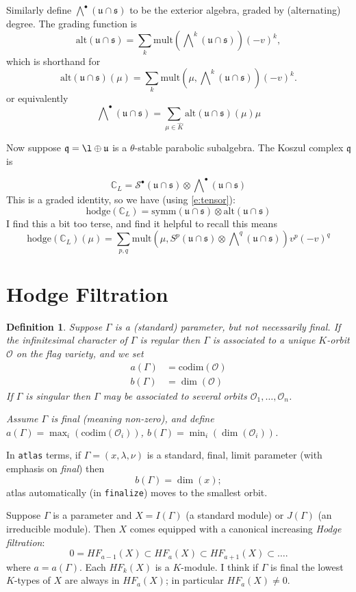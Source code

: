 \documentclass[12pt,leqno]{article}
\newtheorem{definition}[equation]{Definition}
\newcommand{\hodge}{\text{hodge}}
\newcommand{\codim}{\text{codim}}
\newcommand{\hf}{HF}
\newcommand{\mult}{\text{mult}}
\renewcommand{\O}{\mathcal O}
\newcommand{\Sdot}{\mathcal S^{\bullet}}
\newcommand{\symm}{\text{symm}}
\newcommand{\alt}{\text{alt}}
\newcommand{\bigwedgedot}{\mathcal \bigwedge^{\bullet}}
\newcommand{\C}{\mathbb C}
\renewcommand{\q}{\mathfrak q}
\renewcommand{\u}{\mathfrak u}
\newcommand{\ucaps}{\mathfrak u\cap\mathfrak s}
\renewcommand{\sec}[1]{\section{#1}
\renewcommand{\theequation}{\thesection.\arabic{equation}}
  \setcounter{equation}{0}}
\newcommand{\Khat}{\widehat K}
\renewcommand{\sec}[1]{\section{#1}
\renewcommand{\theequation}{\thesection.\arabic{equation}}
  \setcounter{equation}{0}}
\begin{document}
Similarly define
$\bigwedgedot(\ucaps)$ to be the exterior algebra, graded by (alternating) degree.
The grading function is
$$
\alt(\ucaps)=\sum_k\mult(\bigwedge\nolimits^k(\ucaps))(-v)^k,
$$
which is shorthand for
$$
\alt(\ucaps)(\mu)=\sum_k\mult(\mu,\bigwedge\nolimits^k(\ucaps))(-v)^k.
$$
or equivalently
$$
\bigwedgedot(\ucaps)=\sum_{\mu\in\Khat}\alt(\ucaps)(\mu)\mu
$$

Now suppose $\q=\l\oplus\u$ is a $\theta$-stable parabolic subalgebra.
The Koszul complex  $\q$ is

\begin{equation}
\label{e:koszul}
\C_L=\Sdot(\ucaps)\otimes\bigwedgedot(\ucaps)
\end{equation}
This is a graded identity, so
we have (using \eqref{e:tensor}):
\begin{equation}
\label{e:koszul1}
\hodge(\C_L)=\symm(\ucaps)\otimes\alt(\ucaps)
\end{equation}
I find this a bit too terse, and find it helpful to recall this means
$$
\hodge(\C_L)(\mu)=\sum_{p,q} \mult(\mu,S^p(\ucaps)\otimes \bigwedge\nolimits^q(\ucaps))v^p(-v)^q
$$





\sec{Hodge Filtration}
\label{s:hodge}


\begin{definition}
\label{d:ab}
Suppose $\Gamma$ is a (standard) parameter, but not necessarily
final. If the infinitesimal character of $\Gamma$ is regular then
$\Gamma$ is associated to a unique $K$-orbit $\O$ on the flag variety,
and we set {\normalfont
$$
\begin{aligned}
a(\Gamma)&=\codim(\O)\\
b(\Gamma)&=\dim(\O)
\end{aligned}
$$
}
If $\Gamma$ is singular then $\Gamma$ may be associated to several
orbits $\O_1,\dots, \O_n$.

Assume $\Gamma$ is final (meaning non-zero), and define $a(\Gamma)=\max_i(\codim(\O_i))$,
$b(\Gamma)=\min_i(\dim(\O_i))$.
\end{definition}

In {\tt atlas} terms, if $\Gamma=(x,\lambda,\nu)$ is a standard, final,
limit parameter (with emphasis on {\it final}) then
$$
b(\Gamma)=\dim(x);
$$
atlas automatically (in {\tt finalize})  moves to the smallest
orbit.

Suppose $\Gamma$ is a parameter and $X=I(\Gamma)$ (a standard module) or
$J(\Gamma)$ (an irreducible module).
Then $X$ comes equipped with a  canonical
increasing {\it Hodge filtration}:
\begin{equation}
\label{e:F_a}
0=\hf_{a-1}(X)\subset \hf_a(X)\subset \hf_{a+1}(X)\subset\dots.
\end{equation}
where $a=a(\Gamma)$.
Each $\hf_k(X)$ is a $K$-module.
I think if $\Gamma$ is final the lowest $K$-types of $X$ are always in $\hf_a(X)$; in particular $\hf_a(X)\ne 0$.
\end{document}
